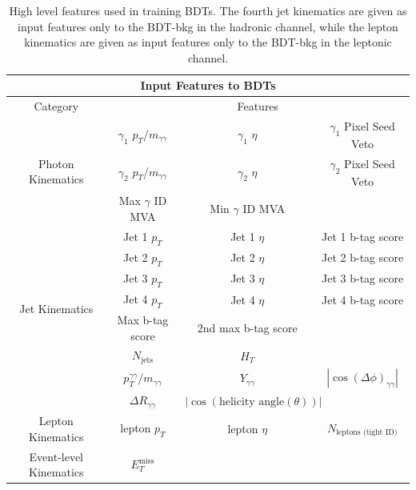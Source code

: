 \begin{table}[h] \scriptsize
\centering
\caption{High level features used in training BDTs. The fourth jet kinematics are given as input features only to the BDT-bkg in the hadronic channel, while the lepton kinematics are given as input features only to the BDT-bkg in the leptonic channel.} 
\renewcommand{\arraystretch}{1.5}
\begin{tabular}{|c| c c c|}
\multicolumn{4}{c}{Input Features to BDTs} \\ \hline
Category & \multicolumn{3}{c|}{Features} \\ \hline
\multirow{3}{*}{Photon Kinematics} & $\gamma_1$ $p_T$/$m_{\gamma \gamma}$ & $\gamma_1$ $\eta$ & $\gamma_1$ Pixel Seed Veto \\
& $\gamma_2$ $p_T$/$m_{\gamma \gamma}$ & $\gamma_2$ $\eta$ & $\gamma_2$ Pixel Seed Veto \\
& Max $\gamma$ ID MVA & Min $\gamma$ ID MVA & \\ \hline
\multirow{7}{*}{Jet Kinematics} & Jet 1 $p_T$ & Jet 1 $\eta$ & Jet 1 b-tag score \\
& Jet 2 $p_T$ & Jet 2 $\eta$ & Jet 2 b-tag score \\
& Jet 3 $p_T$ & Jet 3 $\eta$ & Jet 3 b-tag score \\
& Jet 4 $p_T$ & Jet 4 $\eta$ & Jet 4 b-tag score \\
& Max b-tag score & 2nd max b-tag score & \\
& $N_{\text{jets}}$ & $H_T$ & \\ \hline
\multirow{2}{*}{DiPhoton Kinematics} & $p_T^{\gamma \gamma} / m_{\gamma \gamma}$ & $Y_{\gamma \gamma}$ & $|\cos (\Delta \phi)_{\gamma \gamma}|$ \\
& $\Delta R_{\gamma \gamma}$ & $|\cos(\text{helicity angle} (\theta))|$ & \\ \hline
Lepton Kinematics & lepton $p_T$ & lepton $\eta$ & $N_{\text{leptons (tight ID)}}$ \\ \hline
\multirow{1}{*}{Event-level Kinematics} & $E_T^{\text{miss}}$ & & \\ \hline
\end{tabular}
\label{tab:tth_hlf}
\end{table}

